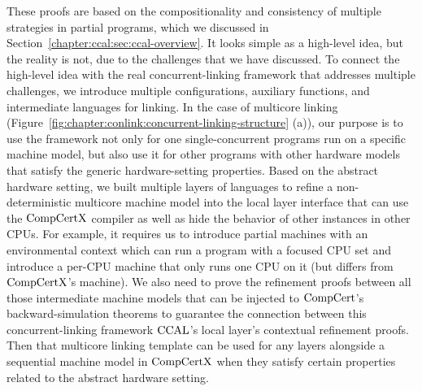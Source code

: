 These proofs are based on the compositionality and  consistency of multiple strategies 
in partial programs, which we discussed in Section~\ref{chapter:ccal:sec:ccal-overview}.
It looks simple as a high-level idea, but the reality is not,
due to the challenges that we have discussed. %
To connect the high-level idea with the real concurrent-linking framework that addresses multiple challenges,
we introduce multiple configurations, auxiliary functions, and intermediate languages for linking. 
In the case of multicore linking (Figure~\ref{fig:chapter:conlink:concurrent-linking-structure} (a)),
our purpose is to use the framework not only for one single-concurrent programs run on a specific machine model, 
but also use it for other programs with other hardware models that satisfy the generic hardware-setting properties. 
Based on the abstract hardware setting, 
we built multiple layers of languages to refine a non-deterministic multicore machine model 
into the local layer interface that can use the $\mathrm{CompCertX}$ compiler as well as 
hide the behavior of other instances in other CPUs.
For example, 
it requires us to introduce partial machines with an environmental context which can run a program with a focused CPU set
and introduce a per-CPU machine that only runs one CPU on it (but differs from $\mathrm{CompCertX}$'s machine). 
We also need to prove the refinement proofs between all those intermediate machine models
that can be injected to $\mathrm{CompCert}$'s backward-simulation theorems to guarantee the connection between this concurrent-linking framework  $\mathrm{CCAL}$'s local layer's contextual refinement proofs. 
Then that multicore linking template can be used for any layers alongside a sequential machine model in $\mathrm{CompCertX}$ when they satisfy certain properties related to the abstract hardware setting. 


